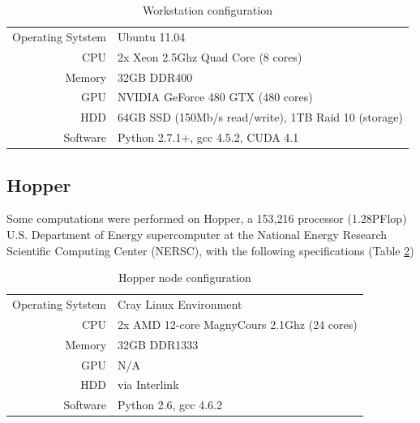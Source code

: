 \documentclass[phd,tocprelim]{cornell}
\begin{document}
\begin{table}[htp]
    \caption{Workstation configuration}
    \label{worktab}
    \begin{center}
\begin{tabular}{r|l}
    Operating Sytstem & Ubuntu 11.04 \\
    CPU & 2x Xeon 2.5Ghz Quad Core (8 cores) \\
    Memory & 32GB DDR400 \\
    GPU & NVIDIA GeForce 480 GTX (480 cores) \\
    HDD & 64GB SSD (150Mb/s read/write), 1TB Raid 10 (storage) \\
    Software & Python 2.7.1+, gcc 4.5.2, CUDA 4.1
\end{tabular}
\end{center}
\end{table}

\subsection{Hopper}

Some computations were performed on Hopper, a 153,216 processor (1.28PFlop) U.S. Department of Energy supercomputer at the National Energy Research Scientific Computing Center (NERSC), with the following specifications (Table \ref{hoppertab})

\begin{table}[htp]
    \caption{Hopper node configuration}
    \label{hoppertab}
    \begin{center}
\begin{tabular}{r|l}
    Operating Sytstem & Cray Linux Environment \\
    CPU & 2x AMD 12-core MagnyCours 2.1Ghz (24 cores) \\
    Memory & 32GB DDR1333 \\
    GPU & N/A \\
    HDD & via Interlink \\
    Software & Python 2.6, gcc 4.6.2
\end{tabular}
\end{center}
\end{table}


%
\end{document}
